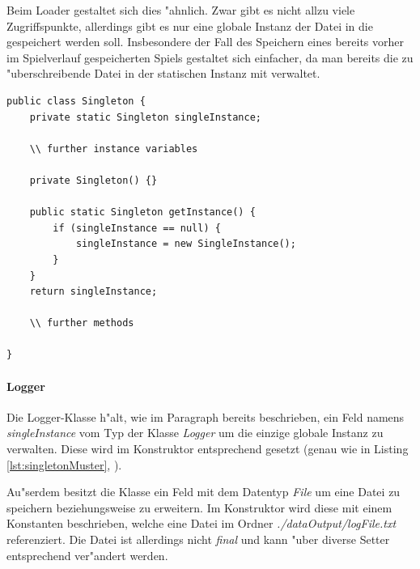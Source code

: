 Beim Loader gestaltet sich dies "ahnlich. Zwar gibt es nicht allzu viele Zugriffspunkte, allerdings gibt es nur eine globale Instanz der Datei in die gespeichert werden soll. Insbesondere der Fall des Speichern eines bereits vorher im Spielverlauf gespeicherten Spiels gestaltet sich einfacher, da man bereits die zu "uberschreibende Datei in der statischen Instanz mit verwaltet. 

\begin{lstlisting}[float,style=CodeHighlighting,caption=Singleton-Muster,label=lst:singletonMuster]
public class Singleton {
	private static Singleton singleInstance; 
	
	\\ further instance variables
	
	private Singleton() {}
	
	public static Singleton getInstance() {
		if (singleInstance == null) {
			singleInstance = new SingleInstance(); 
		}
	}
	return singleInstance; 
	
	\\ further methods	
	
}
\end{lstlisting}


\paragraph{Logger}
\label{par:logger}
Die Logger-Klasse h"alt, wie im Paragraph  bereits beschrieben, ein Feld namens \emph{singleInstance} vom Typ der Klasse \emph{Logger} um die einzige globale Instanz zu verwalten. Diese wird im Konstruktor entsprechend gesetzt (genau wie in Listing \ref{lst:singletonMuster}, ). 

Au"serdem besitzt die Klasse ein Feld mit dem Datentyp \emph{File} um eine Datei zu speichern beziehungsweise zu erweitern. Im Konstruktor wird diese mit einem Konstanten beschrieben, welche eine Datei im Ordner \emph{./dataOutput/logFile.txt} referenziert. Die Datei ist allerdings nicht \emph{final} und kann "uber diverse Setter entsprechend ver"andert werden. 

